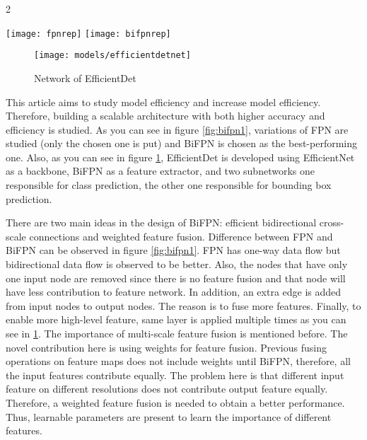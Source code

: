 \documentclass{article}
\begin{document}
\setlength{\parindent}{6ex}


\begin{multicols}{2}
    \begin{figure*}[ht!]
        \texttt{[image: fpnrep]}\hfill
        \texttt{[image: bifpnrep]}
        \caption{FPN (left) and BiFPN (right)}
        \label{fig:bifpn1}
    \end{figure*}
\end{multicols}

\begin{figure}
    \centering
    \texttt{[image: models/efficientdetnet]}
    \caption{Network of EfficientDet}
    \label{fig:efficientdetnet1}
\end{figure}

\indent

This article aims to study model efficiency and increase model 
efficiency. Therefore, building a scalable architecture with both higher 
accuracy and efficiency \cite{efficientdetcite} is studied. As you can see in figure 
\ref{fig:bifpn1}, variations of FPN are studied (only the chosen one is 
put) and BiFPN is chosen as the best-performing one. Also, as you can see 
in figure \ref{fig:efficientdetnet1}, EfficientDet is developed using 
EfficientNet as a backbone, BiFPN as a feature extractor, and two subnetworks 
one responsible for class prediction, the other one responsible for bounding 
box prediction. \par

There are two main ideas in the design of BiFPN: efficient bidirectional 
cross-scale connections and weighted feature fusion. Difference between 
FPN and BiFPN can be observed in figure \ref{fig:bifpn1}. FPN has one-way 
data flow but bidirectional data flow is observed to be better. Also, 
the nodes that have only one input node are removed since there is no 
feature fusion and that node will have less contribution to feature network. 
In addition, an extra edge is added from input nodes to output nodes. The 
reason is to fuse more features. Finally, to enable more high-level feature, 
same layer is applied multiple times as you can see in \ref{fig:efficientdetnet1}.
The importance of multi-scale feature fusion is mentioned before. The novel contribution 
here is using weights for feature fusion. Previous fusing operations 
on feature maps does not include weights until BiFPN, therefore, all the 
input features contribute equally. The problem here is that different 
input feature on different resolutions does not contribute output feature 
equally. Therefore, a weighted feature fusion is needed to obtain a better 
performance. Thus, learnable parameters are present to learn the importance 
of different features. \par
\end{document}
